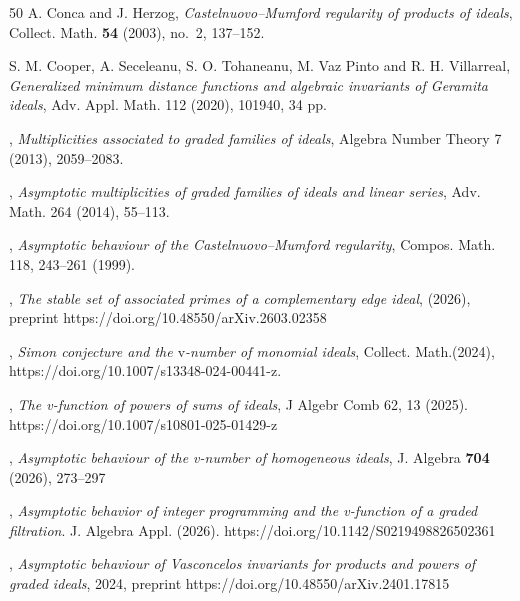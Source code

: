 \documentclass[11pt,reqno,a4paper]{amsart}
\theoremstyle{definition}
\begin{document}
\begin{thebibliography}{50}
A. Conca and J. Herzog,
\textit{Castelnuovo--Mumford regularity of products of ideals},
Collect. Math. \textbf{54} (2003), no.~2, 137--152.

 {S. M. Cooper, A. Seceleanu, S. O. Tohaneanu, M. Vaz Pinto and R. H. Villarreal}, \textit{ Generalized minimum
distance functions and algebraic invariants of Geramita ideals}, Adv. Appl. Math.  112 (2020), 101940,
34 pp.




, \textit{Multiplicities associated to graded families of ideals}, Algebra Number Theory 7 (2013),
2059–2083.



 , \textit {Asymptotic multiplicities of graded families of ideals and linear series}, Adv. Math. 264
(2014), 55–113.



 , \textit{Asymptotic behaviour of the Castelnuovo–Mumford regularity}, Compos. Math. 118, 243–261 (1999).


, {\textit{The stable set of associated primes of a complementary edge ideal}}, (2026), preprint 
https://doi.org/10.48550/arXiv.2603.02358


, {\textit{Simon conjecture and the  $\mathrm{v}$-number of monomial ideals}}, Collect. Math.(2024), https://doi.org/10.1007/s13348-024-00441-z.


, {\textit{ The v-function of powers of sums of ideals}}, J Algebr Comb
62, 13 (2025). https://doi.org/10.1007/s10801-025-01429-z



, \textit {Asymptotic behaviour of the v-number of homogeneous ideals}, J. Algebra \textbf{704} (2026), 273--297

, \textit {Asymptotic behavior of integer programming and the v-function of a graded
filtration}. J. Algebra Appl. (2026). https://doi.org/10.1142/S0219498826502361

, \textit{Asymptotic behaviour of Vasconcelos invariants for products and powers of graded ideals}, 2024, preprint https://doi.org/10.48550/arXiv.2401.17815


\end{thebibliography}
\end{document}
